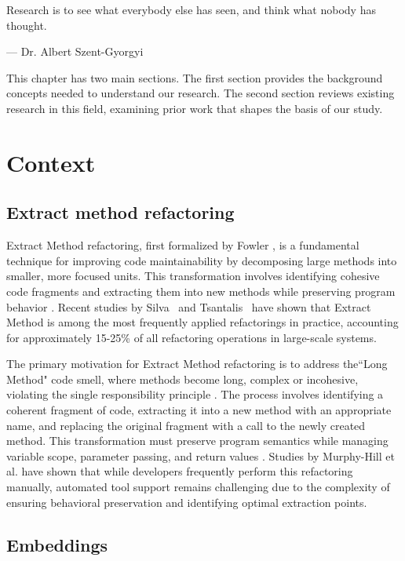 
\epigraph{Research is to see what everybody else has seen, and think what nobody has thought.}{--- \textup{Dr. Albert Szent-Gyorgyi}}

This chapter has two main sections. The first section provides the background concepts needed to understand our research. The second section reviews existing research in this field, examining prior work that shapes the basis of our study.

\section{Context}

\subsection{Extract method refactoring}
Extract Method refactoring, first formalized by Fowler \cite{Fowler1999Refactoring}, is a fundamental technique for improving code maintainability by decomposing large methods into smaller, more focused units. This transformation involves identifying cohesive code fragments and extracting them into new methods while preserving program behavior \cite{murphy2011we}. Recent studies by Silva~\etal{} \cite{silva2016we} and Tsantalis~\etal{} \cite{Tsantalis2018Accurate} have shown that Extract Method is among the most frequently applied refactorings in practice, accounting for approximately 15-25\% of all refactoring operations in large-scale systems.

The primary motivation for Extract Method refactoring is to address the``Long Method" code smell, where methods become long, complex or incohesive, violating the single responsibility principle \cite{martin2009clean}. The process involves identifying a coherent fragment of code, extracting it into a new method with an appropriate name, and replacing the original fragment with a call to the newly created method. This transformation must preserve program semantics while managing variable scope, parameter passing, and return values \cite{kim2012field}. Studies by Murphy-Hill et al. \cite{murphy2011we} have shown that while developers frequently perform this refactoring manually, automated tool support remains challenging due to the complexity of ensuring behavioral preservation and identifying optimal extraction points.

\subsection{Embeddings}

